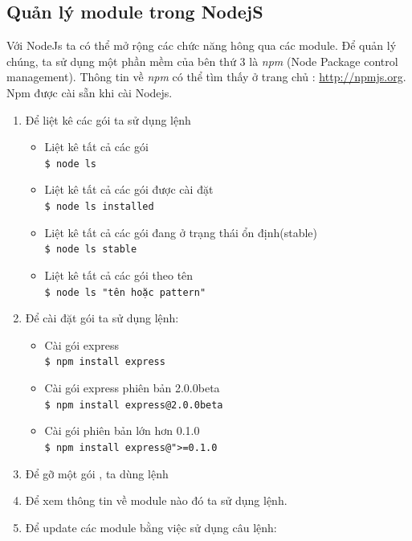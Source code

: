 \documentclass[a4paper,12pt]{report}
\begin{document}
	\subsection{Quản lý module trong NodejS}
		Với NodeJs ta có thể mở rộng các chức năng hông qua các module. Để quản lý chúng, ta sử dụng một phần mềm của bên thứ 3 là \textit{npm} (Node Package control management). Thông tin về \textit{npm} có thể tìm thấy ở trang chủ :  \url{http://npmjs.org}.
	 Npm được cài sẵn khi cài Nodejs.
	\begin{enumerate}
		
			\item Để liệt kê các gói ta sử dụng lệnh \\
				\begin{itemize}
					\item Liệt kê tất cả các gói \\
						\texttt{\$ node ls}
					\item Liệt kê tất cả các gói được cài đặt \\
						\texttt{\$ node ls installed}					
					\item Liệt kê tất cả các gói đang ở trạng thái ổn định(stable)\\
						\texttt{\$ node ls stable}						
					\item Liệt kê tất cả các gói theo tên \\
						\texttt{\$ node ls "tên hoặc pattern"}
				\end{itemize}
			
			\item Để cài đặt gói ta sử dụng lệnh:\\
				\begin{itemize}
					\item Cài gói express \\
						\texttt{\$ npm install express}
					\item Cài gói express phiên bản 2.0.0beta \\
						\texttt{\$ npm install  express@2.0.0beta}						
					\item Cài gói phiên bản lớn hơn 0.1.0 \\
						\texttt{\$ npm install express@">=0.1.0}
				\end{itemize}
			\item Để gỡ một gói , ta dùng lệnh \\
			\item Để xem thông tin về module nào đó ta sử dụng lệnh. \\
			\item Để update các module bằng việc sử dụng câu lệnh:\\
		\end{enumerate}
\end{document}
